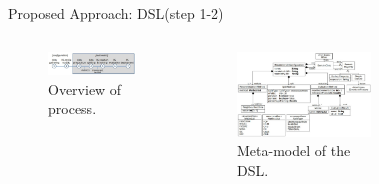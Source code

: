\documentclass{beamer}
\begin{document}
\begin{frame}{Proposed Approach: DSL(step 1-2)}
    \begin{columns}
        \begin{figure}[tpb]
            \centering
            \includegraphics[width=0.8\linewidth]{pic/overview of process.jpg}
            \caption{ Overview of process.}
        \end{figure}
        \begin{figure}[tpb]
            \centering
            \includegraphics[width=\linewidth]{pic/DSL meta-model.jpg}
            \caption{ Meta-model of the DSL.}
        \end{figure}
        \begin{figure}[tpb]
            \centering

\end{figure}
\end{columns}
\end{frame}
\end{document}
